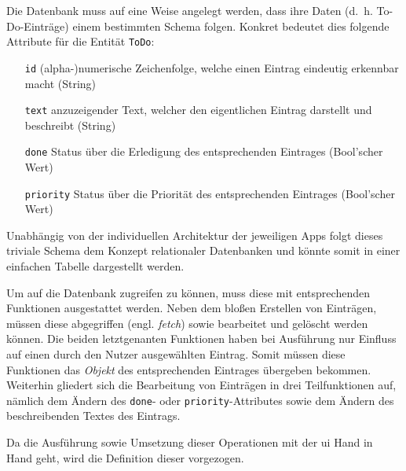 Die Datenbank muss auf eine Weise angelegt werden, dass ihre Daten (d.\ h. To-Do-Einträge) einem bestimmten Schema folgen. Konkret bedeutet dies folgende Attribute für die Entität \texttt{ToDo}:

\begin{itemize}
	\item[\texttt{id}] (alpha-)numerische Zeichenfolge, welche einen Eintrag eindeutig erkennbar macht (String)
	\item[\texttt{text}] anzuzeigender Text, welcher den eigentlichen Eintrag darstellt und beschreibt (String)
	\item[\texttt{done}] Status über die Erledigung des entsprechenden Eintrages (Bool'scher Wert)
	\item[\texttt{priority}] Status über die Priorität des entsprechenden Eintrages (Bool'scher Wert)
\end{itemize}

Unabhängig von der individuellen Architektur der jeweiligen Apps folgt dieses triviale Schema dem Konzept relationaler Datenbanken und könnte somit in einer einfachen Tabelle dargestellt werden.

Um auf die Datenbank zugreifen zu können, muss diese mit entsprechenden Funktionen ausgestattet werden. Neben dem bloßen Erstellen von Einträgen, müssen diese abgegriffen (engl. \textit{fetch}) sowie bearbeitet und gelöscht werden können. Die beiden letztgenanten Funktionen haben bei Ausführung nur Einfluss auf einen durch den Nutzer ausgewählten Eintrag. Somit müssen diese Funktionen das \textit{Objekt} des entsprechenden Eintrages übergeben bekommen. Weiterhin gliedert sich die Bearbeitung von Einträgen in drei Teilfunktionen auf, nämlich dem Ändern des \texttt{done}- oder \texttt{priority}-Attributes sowie dem Ändern des beschreibenden Textes des Eintrags.

Da die Ausführung sowie Umsetzung dieser Operationen mit der \ac{ui} Hand in Hand geht, wird die Definition dieser vorgezogen.
